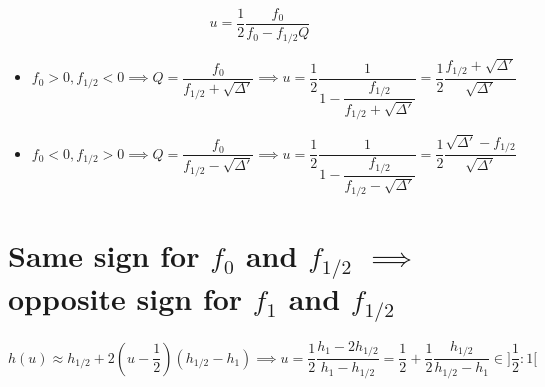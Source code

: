 \documentclass[aps,12pt]{revtex4}
\begin{document}
 $$
 	u =  \frac{1}{2}\dfrac{f_0}{f_0 - f_{1/2}Q}
 $$
 
 \begin{itemize}
 \item 
 $$
 	f_0>0, f_{1/2}<0 \implies Q = \frac{f_0}{f_{1/2}+\sqrt{\Delta'}} 
	\implies u = \dfrac{1}{2} \dfrac{1}{ 1 - \dfrac{f_{1/2}}{f_{1/2}+\sqrt{\Delta'}} } = \dfrac{1}{2} \dfrac{f_{1/2}+\sqrt{\Delta'}}{\sqrt{\Delta'}}
$$


\item 
 $$
 	f_0<0, f_{1/2}>0 \implies Q = \frac{f_0}{f_{1/2}-\sqrt{\Delta'}} 
	\implies u = \dfrac{1}{2} \dfrac{1}{ 1 - \dfrac{f_{1/2}}{f_{1/2}-\sqrt{\Delta'}} } = \dfrac{1}{2}  \dfrac{\sqrt{\Delta'}-f_{1/2}}{\sqrt{\Delta'}}
$$
 \end{itemize}
 
 \section{Same sign for $f_0$ and $f_{1/2}$ $\implies$ opposite sign for $f_1$ and $f_{1/2}$}

$$
	h(u) \approx h_{1/2} + 2(u-\dfrac{1}{2})(h_{1/2}-h_1) \implies u = \dfrac{1}{2}\dfrac{h_1 - 2h_{1/2}}{h_1-h_{1/2}}
	= \frac{1}{2} + \frac{1}{2} \dfrac{h_{1/2}}{h_{1/2}-h_1} \in ]\frac{1}{2}:1[
$$
 
  
  
\end{document}
